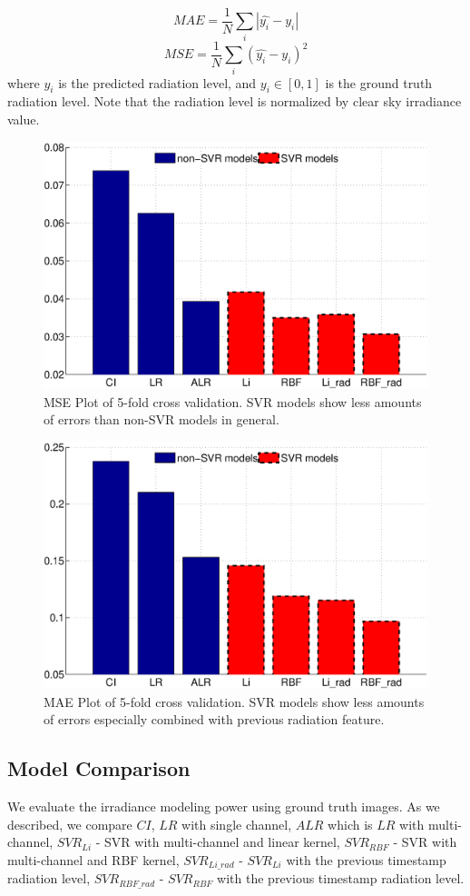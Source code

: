 \documentclass[conference]{IEEEtran}
\begin{document}
%
\begin{equation}
\label{eq:MAE}
MAE=\frac{1}{N} \sum_{i}\left | \hat{y_i} - y_i \right |
\end{equation}
%
\begin{equation}
\label{eq:MSE}
MSE=\frac{1}{N} \sum_{i}{(\hat{y_i} - y_i)^{2}}
\end{equation}
%
where $\hat{y_i}$ is the predicted radiation level, and $y_i \in [0,1]$ is the ground truth radiation level.
Note that the radiation level is normalized by clear sky irradiance value. 
%
\begin{figure}[tb]
\centering
\includegraphics[width=3.2 in]{pics/modelsmse2}
\caption{MSE Plot of 5-fold cross validation. SVR models show less amounts of errors than non-SVR models in general.}
\label{fig:modelsmse}
\end{figure}
%
\begin{figure}[tb]
\centering
\includegraphics[width=3.2 in]{pics/modelsmae2}
\caption{MAE Plot of 5-fold cross validation. SVR models 
show less amounts of errors especially combined with previous radiation feature.}
\label{fig:modelsmae}
\end{figure}
 

\subsection{Model Comparison}
We evaluate the irradiance modeling power using ground truth images.
As we described, we compare $CI$, $LR$ with single channel, $ALR$ which is $LR$ with 
multi-channel, $SVR_{Li}$ - SVR with multi-channel and linear kernel, $SVR_{RBF}$ - 
SVR with multi-channel and RBF kernel, $SVR_{Li\_rad}$ - $SVR_{Li}$ with the
previous timestamp radiation level, $SVR_{RBF\_rad}$ - $SVR_{RBF}$ 
with the previous timestamp radiation level.
\end{document}
